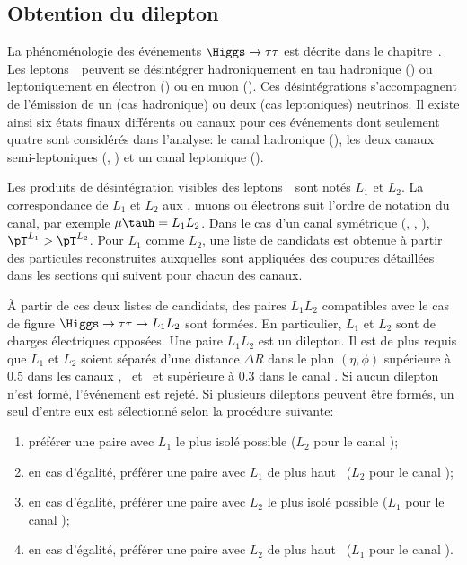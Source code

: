 \subsection{Obtention du dilepton}\label{chapter-HTT_analysis-section-offline_selection}
La phénoménologie des événements $\Higgs\to\tau\tau$ est décrite dans le chapitre~.
Les leptons~\tau\ peuvent se désintégrer hadroniquement en tau hadronique (\tauh) ou leptoniquement en électron (\ele) ou en muon (\mu).
Ces désintégrations s'accompagnent de l'émission de un (cas hadronique) ou deux (cas leptoniques) neutrinos.
Il existe ainsi six états finaux différents ou canaux pour ces événements dont seulement quatre sont considérés dans l'analyse:
le canal hadronique (\tauh\tauh),
les deux canaux semi-leptoniques (\mu\tauh, \ele\tauh)
et un canal leptonique (\ele\mu).
\par
Les produits de désintégration visibles des leptons~\tau\ sont notés $L_1$ et $L_2$.
La correspondance de $L_1$ et $L_2$ aux \tauh, muons ou électrons suit l'ordre de notation du canal, par exemple $\mu\tauh=L_1L_2$.
Dans le cas d'un canal symétrique (\tauh\tauh, \mu\mu, \ele\ele), $\pT^{L_1}>\pT^{L_2}$.
Pour $L_1$ comme $L_2$, une liste de candidats est obtenue à partir des particules reconstruites auxquelles sont appliquées des coupures détaillées dans les sections qui suivent pour chacun des canaux.
\par
À partir de ces deux listes de candidats, des paires $L_1L_2$ compatibles avec le cas de figure $\Higgs\to\tau\tau\to L_1L_2$ sont formées.
En particulier, $L_1$ et $L_2$ sont de charges électriques opposées.
Une paire $L_1L_2$ est un dilepton.
Il est de plus requis que $L_1$ et $L_2$ soient séparés d'une distance $\Delta R$ dans le plan $(\eta,\phi)$ 
supérieure à \num{0.5} dans les canaux \tauh\tauh, \mu\tauh\ et \ele\tauh\
et
supérieure à \num{0.3} dans le canal \ele\mu.
Si aucun dilepton n'est formé, l'événement est rejeté.
Si plusieurs dileptons peuvent être formés,
un seul d'entre eux est sélectionné selon la procédure suivante:
\begin{enumerate}
    \item préférer une paire avec $L_1$ le plus isolé possible ($L_2$ pour le canal \ele\mu);
    \item en cas d'égalité, préférer une paire avec $L_1$ de plus haut \pT\ ($L_2$ pour le canal \ele\mu);
    \item en cas d'égalité, préférer une paire avec $L_2$ le plus isolé possible ($L_1$ pour le canal \ele\mu);
    \item en cas d'égalité, préférer une paire avec $L_2$ de plus haut \pT\ ($L_1$ pour le canal \ele\mu).
\end{enumerate}
